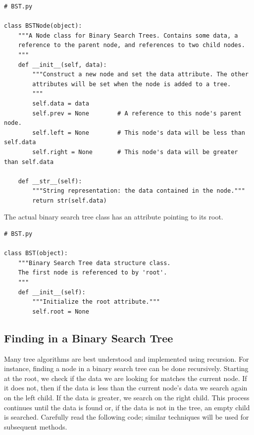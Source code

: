 \begin{lstlisting}
# BST.py

class BSTNode(object):
    """A Node class for Binary Search Trees. Contains some data, a
    reference to the parent node, and references to two child nodes.
    """
    def __init__(self, data):
        """Construct a new node and set the data attribute. The other
        attributes will be set when the node is added to a tree.
        """
        self.data = data
        self.prev = None        # A reference to this node's parent node.
        self.left = None        # This node's data will be less than self.data
        self.right = None       # This node's data will be greater than self.data
        
    def __str__(self):
        """String representation: the data contained in the node."""
        return str(self.data)
\end{lstlisting}

The actual binary search tree class has an attribute pointing to its root.

\begin{lstlisting}
# BST.py

class BST(object):
    """Binary Search Tree data structure class.
    The first node is referenced to by 'root'.
    """
    def __init__(self):
        """Initialize the root attribute."""
        self.root = None
\end{lstlisting}

\subsection*{Finding in a Binary Search Tree}

Many tree algorithms are best understood and implemented using recursion.
For instance, finding a node in a binary search tree can be done recursively.
Starting at the root, we check if the data we are looking for matches the current node.
If it does not, then if the data is less than the current node's data we search again on the left child.
If the data is greater, we search on the right child.
This process continues until the data is found or, if the data is not in the tree, an empty child is searched.
Carefully read the following code; similar techniques will be used for subsequent methods.

